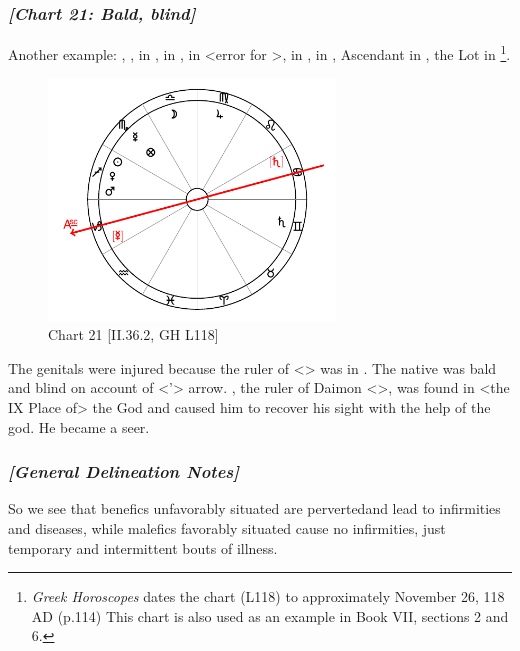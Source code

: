 \subsubsection{\textit{[Chart 21: Bald, blind]}}
Another example: \Sun, \Venus, \Mars\xspace in \Sagittarius, \Moon\xspace in \Libra, \Saturn\xspace in \Cancer <error for
\Gemini>, \Jupiter\xspace in \Virgo, \Mercury\xspace in \Scorpio, Ascendant in \Capricorn, the Lot in \Scorpio
\footnote{\textit{Greek Horoscopes} dates the chart (L118) to approximately November 26, 118 AD (p.114) This chart is also used as an example in Book VII, sections 2 and 6.}.

\clearpage
\begin{figure}
\centering
\vspace{-20pt}
\includegraphics[width=0.68\textwidth]{charts/2_36_2}
\caption{Chart 21 [II.36.2, GH L118]}
\label{fig:chart21}
\end{figure}

The genitals were injured because the ruler of \Scorpio\xspace <\Mars> was in \Sagittarius. The native was bald and blind on account of <\Sagittarius’> arrow. \Jupiter, the ruler of Daimon <\Pisces>, was found in <the IX Place of>
the God and caused him to recover his sight with the help of the god. He became a seer.

\subsubsection{\textit{[General Delineation Notes]}}
So we see that benefics unfavorably situated are perverted\mnbm and lead to infirmities and diseases, while malefics favorably situated cause no infirmities, just temporary and intermittent bouts of illness. 

